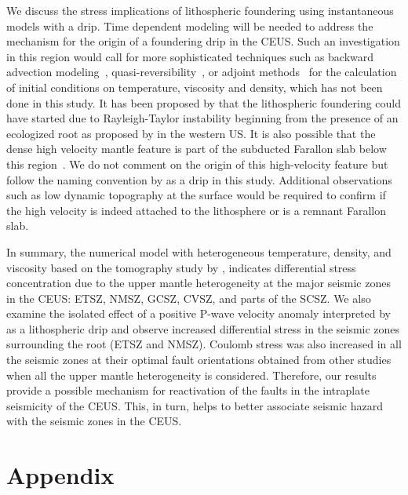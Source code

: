 \documentclass[draft,linenumbers]{agujournal2018}
\begin{document}
    We discuss the stress implications of lithospheric foundering using instantaneous models with a drip. Time dependent modeling will be needed to address the mechanism for the origin of a foundering drip in the CEUS. Such an investigation in this region would call for more sophisticated techniques such as backward advection modeling~\citep[e.g.,][]{conrad2003seismic}, quasi-reversibility~\citep{glivsovic2016new}, or adjoint methods~\citep[e.g.,][]{bunge2003mantle, liu2008reconstructing} for the calculation of initial conditions on temperature, viscosity and density, which has not been done in this study. It has been proposed by \cite{Biryol_2016} that the lithospheric foundering could have started due to Rayleigh-Taylor instability beginning from the presence of an ecologized root as proposed by \citet{le2006mantle} in the western US. It is also possible that the dense high velocity mantle feature is part of the subducted Farallon slab below this region~\citep{schmandt2010seismic}. We do not comment on the origin of this high-velocity feature but follow the naming convention by \citet{Biryol_2016} as a drip in this study. Additional observations such as low dynamic topography at the surface would be required to confirm if the high velocity is indeed attached to the lithosphere or is a remnant Farallon slab.
    
    In summary, the numerical model with heterogeneous temperature, density, and viscosity based on the tomography study by \citet{Biryol_2016}, indicates differential stress concentration due to the upper mantle heterogeneity at the major seismic zones in the CEUS: ETSZ, NMSZ, GCSZ, CVSZ, and parts of the SCSZ. We also examine the isolated effect of a positive P-wave velocity anomaly interpreted by \citet{Biryol_2016} as a lithospheric drip and observe increased differential stress in the seismic zones surrounding the root (ETSZ and NMSZ). Coulomb stress was also increased in all the seismic zones at their optimal fault orientations obtained from other studies when all the upper mantle heterogeneity is considered. Therefore, our results provide a possible mechanism for reactivation of the faults in the intraplate seismicity of the CEUS. This, in turn, helps to better associate seismic hazard with the seismic zones in the CEUS.
    
\appendix
\section{Appendix}
\end{document}
